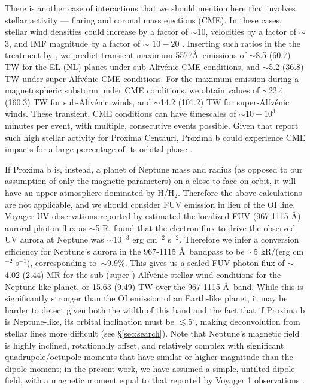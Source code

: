 \documentclass{emulateapj}
\begin{document}
There is another case of interactions that we should mention here that involves stellar activity --- flaring and coronal mass ejections (CME). In these cases, stellar wind densities could increase by a factor of $\sim$10, velocities by a factor of $\sim$3, and IMF magnitude by a factor of $\sim$ $10-20$ \citep{Khodachenko2007,Gopalswamy2009}. Inserting such ratios in the the treatment by \citet{Wang2014}, we predict transient maximum 5577\AA\ emissions of $\sim$8.5 (60.7) TW for the EL (NL) planet under sub-Alfv\'{e}nic CME conditions, and $\sim$5.2 (36.8) TW under super-Alfv\'{e}nic CME conditions. For the maximum emission during a magnetospheric substorm under CME conditions, we obtain values of $\sim$22.4 (160.3) TW for sub-Alfv\'{e}nic winds, and $\sim$14.2 (101.2) TW for super-Alfv\'{e}nic winds. These transient, CME conditions can have timescales of ${\sim} 10-10^3$ minutes per event, with multiple, consecutive events possible. Given that \citet{Davenport2016} report such high stellar activity for Proxima Centauri, Proxima b could experience CME impacts for a large percentage of its orbital phase \citep[e.g.,][]{Khodachenko2007}. 

If Proxima b is, instead, a planet of Neptune mass and radius (as opposed to our assumption of only the magnetic parameters) on a close to face-on orbit, it will have an upper atmosphere dominated by H/H$_2$. Therefore the above calculations are not applicable, and we should consider FUV emission in lieu of the OI line. Voyager UV observations reported by \citet{Sandel1990} estimated the localized FUV (967-1115 \AA) auroral photon flux as $\sim$5 R. \citet{Mauk1994} found that the electron flux to drive the observed UV aurora at Neptune was $\sim$10$^{-3}$ erg cm$^{-2}$ s$^{-2}$. Therefore we infer a conversion efficiency for Neptune's aurora in the 967-1115 \AA\ bandpass to be $\sim$5 kR/(erg cm$^{-2}$ s$^{-1}$), corresponding to~$\sim$9.9\%. This gives us a scaled FUV photon flux of $\sim$4.02 (2.44) MR for the sub-\mbox{(super-)} Alfv\'{e}nic stellar wind conditions for the Neptune-like planet, or 15.63 (9.49) TW over the 967-1115 \AA\ band. While this is significantly stronger than the OI emission of an Earth-like planet, it may be harder to detect given both the width of this band and the fact that if Proxima b is Neptune-like, its orbital inclination must be $\lesssim 5^\circ$, making deconvolution from stellar lines more difficult (see \S\ref{sec:search}). Note that Neptune's magnetic field is highly inclined, rotationally offset, and relatively complex with significant quadrupole/octupole moments that have similar or higher magnitude than the dipole moment; in the present work, we have assumed a simple, untilted dipole field, with a magnetic moment equal to that reported by Voyager 1 observations \citep[e.g.][]{Connerney1991,Mauk2012}. 
\end{document}
